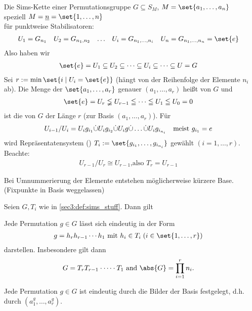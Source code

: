 \begin{definition}
	\label{sec3:def:sims_stuff}
	Die Sims-Kette einer Permutationsgruppe $G \subseteq S_M$, $M = \set{a_1, \dots, a_n}$ speziell $M = \uline{n} = \set{1, \dots, n}$\\
	für punktweise Stabilisatoren:
	\begin{align*}
		\begin{matrix}
			U_1 = G_{n_1} & U_2 = G_{n_1,n_2} & \dots & U_i = G_{n_1,\dots,n_i} &
			U_n = G_{n_1,\dots,n_n} = \set{e}
		\end{matrix}
	\end{align*}
	Also haben wir
	\begin{align*}
		\set{e} = U_1 \subseteq U_2 \subseteq \cdots \subseteq U_i \subseteq \cdots \subseteq U = G
	\end{align*}
	Sei $r:= \min\set{i \mid U_i = \set{e}}$ (hängt von der Reihenfolge der Elemente $n_i$ ab). Die Menge der $\set{a_1, \dots, a_r}$ genauer $(a_1,\dots, a_r)$ heißt  von $G$ und
	\begin{align*}
		\set{e} = U_r \lneqq U_{r-1} \leqq \cdots \leqq U_1 \leqq U_0 = 0
	\end{align*}
	ist die  von $G$ der Länge $r$ (zur Basis $(a_1, \dots, a_r)$). Für
	\begin{align*}
		U_{i-1}/U_i = U_i g_{i_1} \dot\cup U_i g_{i_2} \dot\cup U_i g \dot\cup \dots \dot\cup U_i g_{i_{n_i}}\quad \text{meist }g_{i_1} = e
	\end{align*}
	wird Repräsentatensystem () $T_i := \set{g_{i_1}, \dots, g_{i_{n_i}}}$ gewählt $(i = 1, \dots, r)$.\\
	Beachte: 
	\begin{align*}
		U_{r-1}/U_r \cong U_{r-1}\text{,also } T_r = U_{r-1}
	\end{align*}
\end{definition}
Bei Umnummerierung der Elemente entstehen möglicherweise kürzere Base. (Fixpunkte in Basis weggelassen)
\begin{proposition}
		\label{sec3:prop:sims_chain_unique}
	Seien $G,T_i$ wie in \cref{sec3:def:sims_stuff}. Dann gilt
	\begin{defenum}
		\item Jede Permutation $g \in G$ lässt sich eindeutig in der Form
		\begin{align*}
			g = h_r h_{r-1} \cdots h_1 \mit h_i \in T_i\;(i \in \set{1, \dots, r})
		\end{align*}
		darstellen. Insbesondere gilt dann
		\begin{align*}
			G = T_r T_{r-1} \cdot \dots \cdot T_1 \nd \abs{G} = \prod_{i=1}^r n_i.
		\end{align*} \label{sec3:prop3:unique_simsform}
		\item Jede Permutation $g \in G$ ist eindeutig durch die Bilder der Basis festgelegt, d.h. durch $(a_1^g, \dots, a_r^g)$.\label{sec3:def:unique_image}
	\end{defenum}
\end{proposition}
